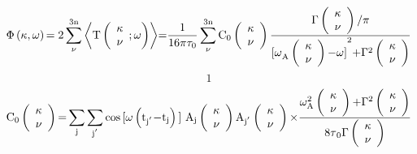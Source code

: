\documentclass{article}
\begin{document}
\[\Phi \left({\mathbf \kappa },\omega \right){\rm =2}\sum^{{\rm 3n}}_{\nu }{\left\langle {\rm T}\left( \begin{array}{c}
{\mathbf \kappa } \\ 
\nu  \end{array}
;\omega \right)\right\rangle }{\rm =}\frac{{\rm 1}}{{\rm 16}\pi {\tau }_0}\sum^{{\rm 3n}}_{\nu }{{{\rm C}}_0\left( \begin{array}{c}
{\mathbf \kappa } \\ 
\nu  \end{array}
\right)\frac{\Gamma \left( \begin{array}{c}
{\mathbf \kappa } \\ 
\nu  \end{array}
\right){\rm /}\pi }{{{{\rm [}\omega }_{{\rm A}}\left( \begin{array}{c}
{\mathbf \kappa } \\ 
\nu  \end{array}
\right){\rm -}\omega {\rm ]}}^{{\rm 2}}{\rm +}{\Gamma }^{{\rm 2}}\left( \begin{array}{c}
{\mathbf \kappa } \\ 
\nu  \end{array}
\right)}}\] 
\[1\] 
\[{{\rm C}}_0\left( \begin{array}{c}
{\mathbf \kappa } \\ 
\nu  \end{array}
\right){\rm =}\sum_{{\rm j}}{\sum_{{{\rm j}}^{{\rm '}}}{{\cos  {\rm [}\omega \left({{\rm t}}_{{{\rm j}}^{{\rm '}}}{\rm -}{{\rm t}}_{{\rm j}}\right){\rm ]}\ }{{\rm A}}_{{\rm j}}\left( \begin{array}{c}
{\mathbf \kappa } \\ 
\nu  \end{array}
\right){{\rm A}}_{{{\rm j}}^{{\rm '}}}\left( \begin{array}{c}
{\mathbf \kappa } \\ 
\nu  \end{array}
\right){\rm \times }\frac{{\omega }^{{\rm 2}}_{{\rm A}}\left( \begin{array}{c}
{\mathbf \kappa } \\ 
\nu  \end{array}
\right){\rm +}{\Gamma }^{{\rm 2}}\left( \begin{array}{c}
{\mathbf \kappa } \\ 
\nu  \end{array}
\right)}{{{\rm 8}\tau }_0\Gamma \left( \begin{array}{c}
{\mathbf \kappa } \\ 
\nu  \end{array}
\right)}}}\] 
\end{document}
